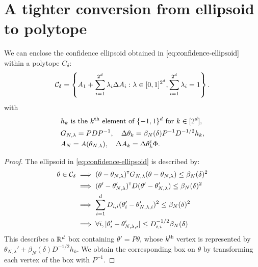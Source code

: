 \documentclass{article}
\begin{document}
\section{A tighter conversion from ellipsoid to polytope}
\label{sec:tight-polytope}
\begin{lemma}
	\label{lem:tight_polytope}
	We can enclose the confidence ellipsoid obtained in $\eqref{eq:confidence-ellipsoid}$ within a polytope $C_\delta$:
	\begin{equation}
	\mathcal{C}_\delta = \left\{ A_{1}+\sum_{i=1}^{2^d}\lambda_{i}\Delta A_{i}: \lambda\in[0, 1]^{2^d},  \sum_{i=1}^{2^d}\lambda_{i}=1\right\}.
	\end{equation}
	with 
	\begin{align*}
	&h_k \text{ is the }k^\text{th}\text{ element of }\{-1,1\}^d\text{ for } k\in[2^d],\\
	&G_{N,\lambda} = PDP^{-1}, \quad \Delta\theta_k = \beta_{N}(\delta)P^{-1}D^{-1/2} h_k, \\
	&A_N = A(\theta_{N,\lambda}), \quad \Delta A_k = \Delta\theta_k^{\mathsf{\scriptscriptstyle T}}\Phi.
	\end{align*}
\end{lemma}

\begin{proof}
	The ellipsoid in \eqref{eq:confidence-ellipsoid} is described by:
	\begin{align*}
	\theta\in\mathcal{C}_\delta &\implies
	(\theta-\theta_{N,\lambda})^{\mathsf{\scriptscriptstyle T}} G_{N,\lambda}(\theta-\theta_{N,\lambda}) \leq \beta_{N}(\delta)^2\\
	&\implies (\theta'-\theta'_{N,\lambda})^{\mathsf{\scriptscriptstyle T}} D (\theta'-\theta'_{N,\lambda}) \leq \beta_{N}(\delta)^2\\
	&\implies \sum_{i=1}^d D_{i,i}(\theta'_i-\theta'_{N,\lambda,i})^2\leq \beta_{N}(\delta)^2\\
	&\implies\forall i, |\theta'_i-\theta'_{N,\lambda,i}|\leq D_{i,i}^{-1/2}\beta_{N}(\delta)
	\end{align*}
	This describes a $\mathbb{R}^d$ box containing $\theta' = P\theta$, whose $k^\text{th}$ vertex is represented by $\theta_{N,\lambda}' + \beta_{N}(\delta)D^{-1/2} h_k$. We obtain the corresponding box on $\theta$ by transforming each vertex of the box with $P^{-1}$.
\end{proof}

\end{document}
